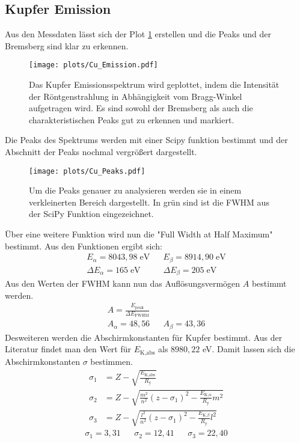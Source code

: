 \subsection{Kupfer Emission}
Aus den Messdaten lässt sich der Plot \ref{fig:Cu_Emission} erstellen und die Peaks und der Bremsberg sind klar zu erkennen.
\begin{figure}
    \centering
    \texttt{[image: plots/Cu\_Emission.pdf]}
    \caption{Das Kupfer Emissionsspektrum wird geplottet, indem die Intensität der Röntgenstrahlung in Abhängigkeit vom Bragg-Winkel aufgetragen wird.
    Es sind sowohl der Bremsberg als auch die charakteristischen Peaks gut zu erkennen und markiert.}
    \label{fig:Cu_Emission}
\end{figure}
Die Peaks des Spektrums werden mit einer Scipy funktion bestimmt und der Abschnitt der Peaks nochmal vergrößert dargestellt.
\begin{figure}
    \centering
    \texttt{[image: plots/Cu\_Peaks.pdf]}
    \caption{Um die Peaks genauer zu analysieren werden sie in einem verkleinerten Bereich dargestellt.
    In grün sind ist die FWHM aus der SciPy Funktion eingezeichnet.}
    \label{fig:Cu_Peaks}
\end{figure}
Über eine weitere Funktion wird nun die "Full Width at Half Maximum" bestimmt.
Aus den Funktionen ergibt sich:
\begin{align*}
    E_{\alpha} = 8043,98 \; \text{eV} && E_{\beta} = 8914,90 \; \text{eV}\\
    \Delta E_{\alpha} = 165 \;\text{eV} && \Delta E_{\beta} = 205 \;\text{eV}
\end{align*}
Aus den Werten der FWHM kann nun das Auflösungsvermögen $A$ bestimmt werden.
\begin{align}
    A = \frac{E_{\text{peak}}}{\Delta E_{\text{FWHM}}} \nonumber\\
    A_{\alpha}= 48,56 && A_{\beta} = 43,36
\end{align}
Desweiteren werden die Abschirmkonstanten für Kupfer bestimmt.
Aus der Literatur findet man den Wert für $E_{\text{K,abs}}$ als $8980,22$ eV.
Damit lassen sich die Abschirmkonstanten $\sigma$ bestimmen.
\begin{align*}
    \sigma_1 &= Z-\sqrt{\frac{E_{\text{K,abs}}}{R_{\text{y}}}} \\
    \sigma_2 &= Z-\sqrt{ \frac{m^2}{n^2}\left(z-\sigma_1\right)^2- \frac{E_{\text{K,}\alpha}}{R_{\text{y}}}m^2 } \\
    \sigma_3 &= Z-\sqrt{ \frac{l^2}{n^2}\left(z-\sigma_1\right)^2- \frac{E_{\text{K,}\beta}}{R_{\text{y}}}l^2 }
\end{align*}
\begin{align}
    \sigma_1 = 3,31 && \sigma_2 = 12,41 && \sigma_3 = 22,40 
\end{align}

